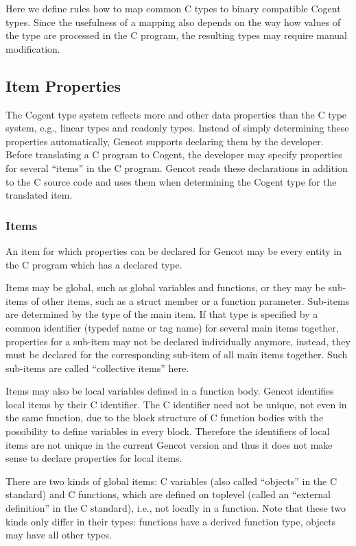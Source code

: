 
Here we define rules how to map common C types to binary compatible Cogent types. Since the usefulness of a mapping
also depends on the way how values of the type are processed in the C program, the resulting types may require manual 
modification.

\subsection{Item Properties}
\label{design-types-itemprops}

The Cogent type system reflects more and other data properties than the C type system, e.g., linear types
and readonly types. Instead of simply determining these properties automatically, Gencot supports declaring 
them by the developer. Before translating a C program to Cogent, the developer may specify properties
for several ``items'' in the C program. Gencot reads these declarations in addition to the C source code
and uses them when determining the Cogent type for the translated item.

\subsubsection{Items}

An item for which properties can be declared for Gencot may be every entity in the C program which has a declared type.

Items may be global, such as global variables and functions, or they may be sub-items of other items, such as a
struct member or a function parameter. Sub-items are determined by the type of the main item. If that type is
specified by a common identifier (typedef name or tag name) for several main items together, properties for
a sub-item may not be declared individually anymore, instead, they must be declared for the corresponding sub-item
of all main items together. Such sub-items are called ``collective items'' here.

Items may also be local variables defined in a function body. Gencot identifies local items by their C identifier.
The C identifier need not be unique, not even in the same function, due to the block structure of C function bodies
with the possibility to define variables in every block. Therefore the identifiers of local items are not 
unique in the current Gencot version and thus it does not make sense to declare properties for local items. 

There are two kinds of global items: C variables (also called ``objects'' in the C standard) and C functions, which
are defined on toplevel (called an ``external definition'' in the C standard), i.e., not locally in a function. Note that
these two kinds only differ in their types: functions have a derived function type, objects may have all other types.

